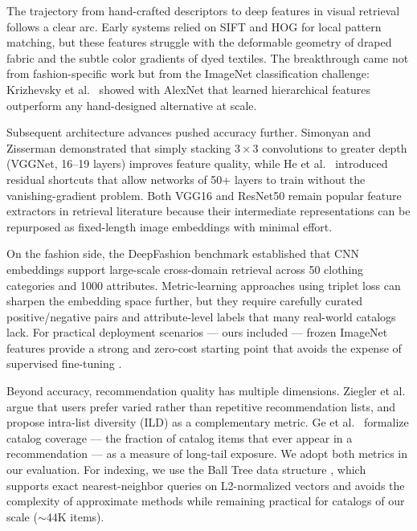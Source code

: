 \documentclass[conference]{IEEEtran}
\begin{document}
The trajectory from hand-crafted descriptors to deep features in visual
retrieval follows a clear arc. Early systems relied on SIFT
\cite{lowe2004distinctive} and HOG for local pattern matching, but
these features struggle with the deformable geometry of draped fabric
and the subtle color gradients of dyed textiles. The breakthrough came
not from fashion-specific work but from the ImageNet classification
challenge: Krizhevsky et al.\ \cite{krizhevsky2012imagenet} showed with
AlexNet that learned hierarchical features outperform any hand-designed
alternative at scale.

Subsequent architecture advances pushed accuracy further. Simonyan and
Zisserman \cite{simonyan2015vggnet} demonstrated that simply stacking
$3{\times}3$ convolutions to greater depth (VGGNet, 16--19 layers)
improves feature quality, while He et al.\ \cite{he2016resnet}
introduced residual shortcuts that allow networks of 50+ layers to train
without the vanishing-gradient problem. Both VGG16 and ResNet50 remain
popular feature extractors in retrieval literature because their
intermediate representations can be repurposed as fixed-length image
embeddings with minimal effort.

On the fashion side, the DeepFashion benchmark \cite{liu2016deepfashion}
established that CNN embeddings support large-scale cross-domain
retrieval across 50 clothing categories and 1000 attributes.
Metric-learning approaches using triplet loss
\cite{schroff2015facenet} can sharpen the embedding space further, but
they require carefully curated positive/negative pairs and
attribute-level labels that many real-world catalogs lack. For practical
deployment scenarios --- ours included --- frozen ImageNet features
provide a strong and zero-cost starting point that avoids the expense
of supervised fine-tuning \cite{yosinski2014transferable}.

Beyond accuracy, recommendation quality has multiple dimensions.
Ziegler et al.\ \cite{ziegler2005diversification} argue that users
prefer varied rather than repetitive recommendation lists, and propose
intra-list diversity (ILD) as a complementary metric. Ge et al.\
\cite{ge2010beyond} formalize catalog coverage --- the fraction of
catalog items that ever appear in a recommendation --- as a measure of
long-tail exposure. We adopt both metrics in our evaluation. For
indexing, we use the Ball Tree data structure
\cite{omohundro1989five}, which supports exact nearest-neighbor queries
on L2-normalized vectors and avoids the complexity of approximate
methods while remaining practical for catalogs of our scale ($\sim$44K
items).
\end{document}
